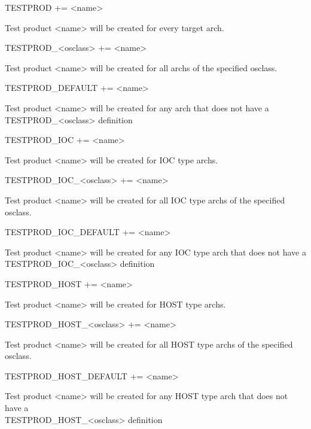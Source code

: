 \begin{description}

\item {}TESTPROD += \textless{}name\textgreater{}

Test product \textless{}name\textgreater{} will be created for every target arch.

\item TESTPROD\_\textless{}osclass\textgreater{} += \textless{}name\textgreater{}

Test product \textless{}name\textgreater{} will be created for all archs of the specified osclass.

\item TESTPROD\_DEFAULT += \textless{}name\textgreater{}

Test product \textless{}name\textgreater{} will be created for any arch that does not have a \\
TESTPROD\_\textless{}osclass\textgreater{} definition

\item

\item {}TESTPROD\_IOC += \textless{}name\textgreater{}

Test product \textless{}name\textgreater{} will be created for IOC type archs.

\item TESTPROD\_IOC\_\textless{}osclass\textgreater{} += \textless{}name\textgreater{}

Test product \textless{}name\textgreater{} will be created for all IOC type archs of the specified osclass.

\item TESTPROD\_IOC\_DEFAULT += \textless{}name\textgreater{}

Test product \textless{}name\textgreater{} will be created for any IOC type arch that does not have a \\
TESTPROD\_IOC\_\textless{}osclass\textgreater{} definition

\item

\item {}TESTPROD\_HOST += \textless{}name\textgreater{}

Test product \textless{}name\textgreater{} will be created for HOST type archs.

\item TESTPROD\_HOST\_\textless{}osclass\textgreater{} += \textless{}name\textgreater{}

Test product \textless{}name\textgreater{} will be created for all HOST type archs of the specified osclass.

\item TESTPROD\_HOST\_DEFAULT += \textless{}name\textgreater{}

Test product \textless{}name\textgreater{} will be created for any HOST type arch that does not have a \\
TESTPROD\_HOST\_\textless{}osclass\textgreater{} definition

\end{description}

